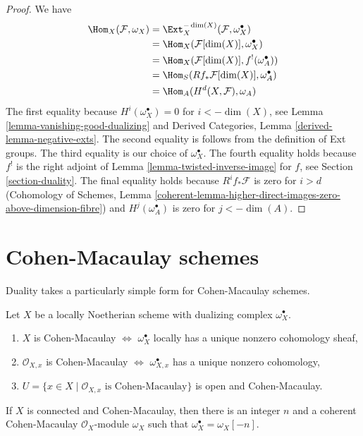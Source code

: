\begin{proof}
We have
\begin{align*}
\Hom_X(\mathcal{F}, \omega_X)
& =
\Ext^{-\dim(X)}_X(\mathcal{F}, \omega_X^\bullet) \\
& =
\Hom_X(\mathcal{F}[\dim(X)], \omega_X^\bullet) \\
& =
\Hom_X(\mathcal{F}[\dim(X)], f^!(\omega_A^\bullet)) \\
& =
\Hom_S(Rf_*\mathcal{F}[\dim(X)], \omega_A^\bullet) \\
& =
\Hom_A(H^d(X, \mathcal{F}), \omega_A)
\end{align*}
The first equality because $H^i(\omega_X^\bullet) = 0$ for
$i < -\dim(X)$, see Lemma \ref{lemma-vanishing-good-dualizing} and
Derived Categories, Lemma \ref{derived-lemma-negative-exts}.
The second equality is follows from the definition of Ext groups.
The third equality is our choice of $\omega_X^\bullet$.
The fourth equality holds because $f^!$ is the
right adjoint of Lemma \ref{lemma-twisted-inverse-image} for
$f$, see Section \ref{section-duality}.
The final equality holds because $R^if_*\mathcal{F}$ is zero
for $i > d$ (Cohomology of Schemes, Lemma
\ref{coherent-lemma-higher-direct-images-zero-above-dimension-fibre})
and $H^j(\omega_A^\bullet)$ is zero for $j < -\dim(A)$.
\end{proof}








\section{Cohen-Macaulay schemes}
\label{section-CM}

\noindent
Duality takes a particularly simple form for Cohen-Macaulay schemes.

\begin{lemma}
\label{lemma-dualizing-module-CM-scheme}
Let $X$ be a locally Noetherian scheme with dualizing complex
$\omega_X^\bullet$.
\begin{enumerate}
\item $X$ is Cohen-Macaulay $\Leftrightarrow$ $\omega_X^\bullet$
locally has a unique nonzero cohomology sheaf,
\item $\mathcal{O}_{X, x}$ is Cohen-Macaulay $\Leftrightarrow$
$\omega_{X, x}^\bullet$ has a unique nonzero cohomology,
\item $U = \{x \in X \mid \mathcal{O}_{X, x}\text{ is Cohen-Macaulay}\}$
is open and Cohen-Macaulay.
\end{enumerate}
If $X$ is connected and Cohen-Macaulay, then there is an integer $n$
and a coherent Cohen-Macaulay $\mathcal{O}_X$-module $\omega_X$
such that $\omega_X^\bullet = \omega_X[-n]$.
\end{lemma}

